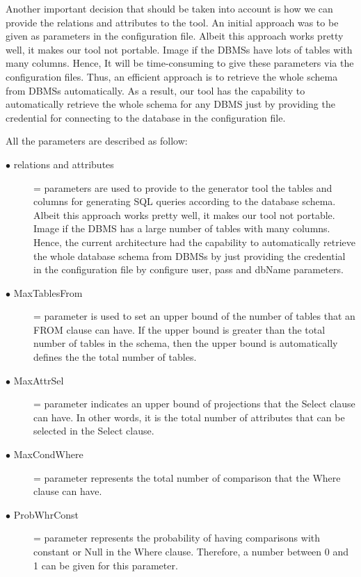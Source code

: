 Another important decision that should be taken into account is how we can provide the relations and attributes to the tool. An initial approach was to be given as parameters in the configuration file. Albeit this approach works pretty well, it makes our tool not portable. Image if the DBMSs have lots of tables with many columns. Hence, It will be time-consuming to give these parameters via the configuration files. Thus, an efficient approach is to retrieve the whole schema from DBMSs automatically. As a result, our tool has the capability to automatically retrieve the whole schema for any DBMS just by providing the credential for connecting to the database in the configuration file.   

All the parameters are described as follow:
\begin{description}
   \item[$\bullet$ relations and attributes] =  parameters are used to provide to the generator tool the tables and columns for generating SQL queries according to the database schema. Albeit this approach works pretty well, it makes our tool not portable. Image if the DBMS has a large number of tables with many columns. Hence, the current architecture had the capability to automatically retrieve the whole database schema from DBMSs by just providing the credential in the configuration file by configure user, pass and dbName parameters. 

\item[$\bullet$ MaxTablesFrom] = parameter is used to set an upper bound of the number of tables that an FROM clause can have. If the upper bound is greater than the total number of tables in the schema, then the upper bound is automatically defines the the total number of tables. 

\item[$\bullet$ MaxAttrSel] = parameter indicates an upper bound of projections that the Select clause can have. In other words, it is the total number of attributes that can be selected in the Select clause.
 
\item[$\bullet$ MaxCondWhere]= parameter represents the total number of comparison that the Where clause can have. 

 
\item[$\bullet$ ProbWhrConst] = parameter represents the probability of having comparisons with constant or Null in the Where clause. Therefore, a number between 0 and 1 can be given for this parameter.  


\end{description}
